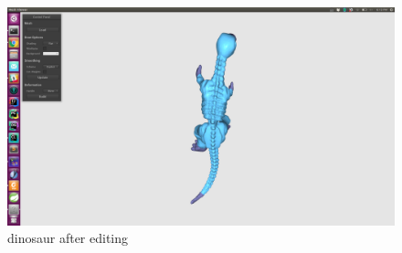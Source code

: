 \documentclass[twocolumn, a4paper]{article}
\begin{document}
\begin{figure}[H]
	\centering
	\includegraphics[width=1.0\linewidth]{dinosaur_after2.png}
	\caption{dinosaur after editing}
\end{figure}
\end{document}

